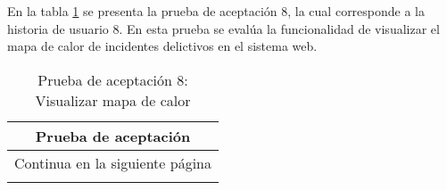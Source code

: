 En la tabla \ref{tab:prueba-8} se presenta la prueba de aceptación 8, la cual corresponde a la historia de usuario 8.
En esta prueba se evalúa la funcionalidad de visualizar el mapa de calor de incidentes delictivos en el sistema web.

\begin{longtable}{|p{6.7cm}|p{6.7cm}|}
    \caption{Prueba de aceptación 8: Visualizar mapa de calor} \label{tab:prueba-8}
    \\
    \hline
    \multicolumn{2}{|c|}{\textbf{Prueba de aceptación}}                                                                                                                                                                                                                                                                             \\
    \hline

    \endfirsthead

    \hline
    \endhead

    \hline
    \multicolumn{2}{|c|}{{Continua en la siguiente página}}                                                                                                                                                                                                                                                                         \\
    \hline
    \endfoot


\end{longtable}
